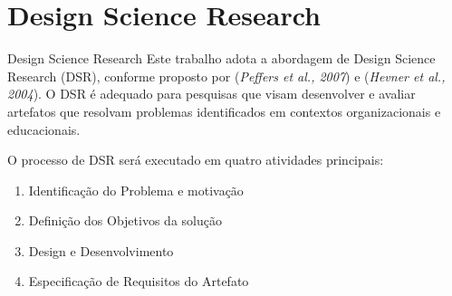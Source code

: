 \documentclass{if-beamer}
\begin{document}
\section{Design Science Research}
\begin{frame}{Design Science Research}
Este trabalho adota a abordagem de Design Science Research (DSR), conforme proposto por (\textit{Peffers et al., 2007}) e (\textit{Hevner et al., 2004}). O DSR é adequado para pesquisas que visam desenvolver e avaliar artefatos que resolvam problemas identificados em contextos organizacionais e educacionais.
\vspace{0.35in}

O processo de DSR será executado em quatro atividades principais:

\begin{enumerate}
\item Identificação do Problema e motivação
\item Definição dos Objetivos da solução
\item Design e Desenvolvimento
\item Especificação de Requisitos do Artefato
\end{enumerate}
\end{frame}
\end{document}
